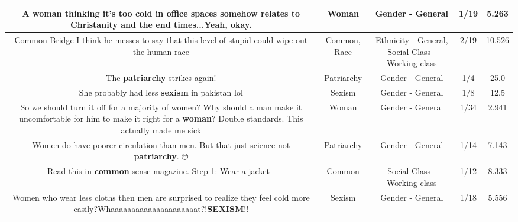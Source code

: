 \documentclass[11pt]{article}
\newlength\mylength
\begin{document}
\begin{center}
\begin{longtable}{|C{.65\mylength}|C{.30\mylength}|C{.12\mylength}|C{.12\mylength}|C{.12\mylength}|}
  \small A \textbf{woman} thinking it's too cold in office spaces somehow relates to Christanity and the end times...Yeah, okay.\normalsize   & Woman & Gender - General & 1/19 & 5.263 \\  \hline
  \small Common Bridge I think he messes to say that this level of stupid could wipe out the human race\normalsize   & Common, Race & Ethnicity - General, Social Class - Working class & 2/19 & 10.526 \\  \hline
  \small The \textbf{patriarchy} strikes again!\normalsize   & Patriarchy & Gender - General & 1/4 & 25.0 \\  \hline
  \small She probably had less \textbf{sexism} in pakistan lol\normalsize   & Sexism & Gender - General & 1/8 & 12.5 \\  \hline
  \small So we should turn it off for a majority of women? Why should a man make it uncomfortable for him to make it right for a \textbf{woman}? Double standards. This actually made me sick\normalsize   & Woman & Gender - General & 1/34 & 2.941 \\  \hline
  \small Women do have poorer circulation than men. But that just science not \textbf{patriarchy}. 🙄\normalsize   & Patriarchy & Gender - General & 1/14 & 7.143 \\  \hline
  \small Read this in \textbf{common} sense magazine. Step 1: Wear a jacket 🙁\normalsize   & Common & Social Class - Working class & 1/12 & 8.333 \\  \hline
  \small Women who wear less cloths then men are surprised to realize they feel cold more easily?Whaaaaaaaaaaaaaaaaaaaaat?!\textbf{SEXISM}!!\normalsize   & Sexism & Gender - General & 1/18 & 5.556 \\  \hline

\end{longtable}
\end{center}
\end{document}
